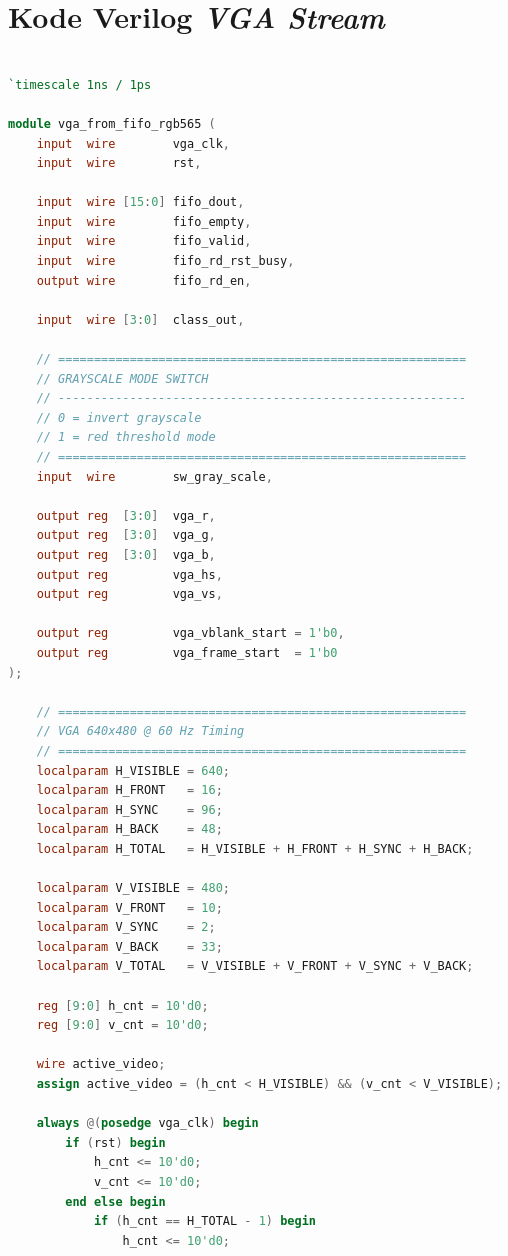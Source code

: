 \section{Kode Verilog \emph{VGA Stream}}

    \begin{lstlisting}[language=Verilog, title={Kode untuk menampilkan data hasil vga ke monitor}, label={code:vga-rgb-565}]

`timescale 1ns / 1ps

module vga_from_fifo_rgb565 (
    input  wire        vga_clk,
    input  wire        rst,

    input  wire [15:0] fifo_dout,
    input  wire        fifo_empty,
    input  wire        fifo_valid,
    input  wire        fifo_rd_rst_busy,
    output wire        fifo_rd_en,

    input  wire [3:0]  class_out,

    // =========================================================
    // GRAYSCALE MODE SWITCH
    // ---------------------------------------------------------
    // 0 = invert grayscale
    // 1 = red threshold mode
    // =========================================================
    input  wire        sw_gray_scale,

    output reg  [3:0]  vga_r,
    output reg  [3:0]  vga_g,
    output reg  [3:0]  vga_b,
    output reg         vga_hs,
    output reg         vga_vs,

    output reg         vga_vblank_start = 1'b0,
    output reg         vga_frame_start  = 1'b0
);

    // =========================================================
    // VGA 640x480 @ 60 Hz Timing
    // =========================================================
    localparam H_VISIBLE = 640;
    localparam H_FRONT   = 16;
    localparam H_SYNC    = 96;
    localparam H_BACK    = 48;
    localparam H_TOTAL   = H_VISIBLE + H_FRONT + H_SYNC + H_BACK;

    localparam V_VISIBLE = 480;
    localparam V_FRONT   = 10;
    localparam V_SYNC    = 2;
    localparam V_BACK    = 33;
    localparam V_TOTAL   = V_VISIBLE + V_FRONT + V_SYNC + V_BACK;

    reg [9:0] h_cnt = 10'd0;
    reg [9:0] v_cnt = 10'd0;

    wire active_video;
    assign active_video = (h_cnt < H_VISIBLE) && (v_cnt < V_VISIBLE);

    always @(posedge vga_clk) begin
        if (rst) begin
            h_cnt <= 10'd0;
            v_cnt <= 10'd0;
        end else begin
            if (h_cnt == H_TOTAL - 1) begin
                h_cnt <= 10'd0;


\end{lstlisting}
